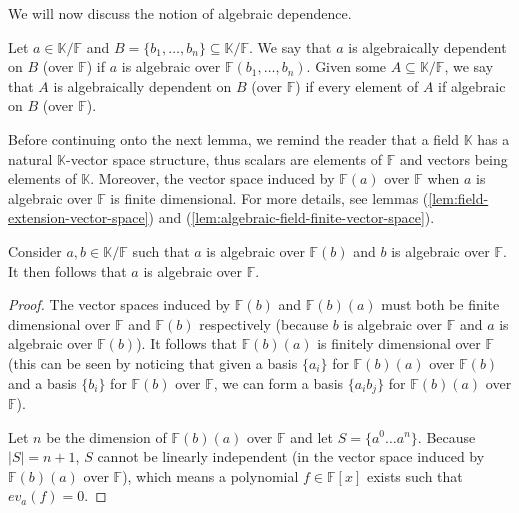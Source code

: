 We will now discuss the notion of algebraic dependence.

\begin{defn}
	Let $a \in \mathbb K / \mathbb F$ and $B = \{b _1, \ldots, b _n \} \subseteq  \mathbb K / \mathbb F$. We say that $a$ is algebraically dependent on $B$ (over $ \mathbb{F} $) if $a$ is algebraic over $\mathbb F(b _1, \ldots, b _n )$. Given some $A \subseteq  \mathbb K / \mathbb{F} $, we say that $A$ is algebraically dependent on $B$ (over $\mathbb{F} $) if every element of $A$ if algebraic on $B$ (over $\mathbb{F} $).
\end{defn}

Before continuing onto the next lemma, we remind the reader that a field $\mathbb{K}$ has a natural $\mathbb{K}$-vector space structure, thus scalars are elements of $\mathbb{F} $ and vectors being elements of $\mathbb K$. Moreover, the vector space induced by $\mathbb{F} (a)$ over $\mathbb{F} $ when $a$ is algebraic over $\mathbb{F} $ is finite dimensional. For more details, see lemmas (\ref{lem:field-extension-vector-space}) and (\ref{lem:algebraic-field-finite-vector-space}).

\begin{lemma}\label{lem:algebraic-transitivity}
	Consider $a, b \in \mathbb K / \mathbb{F} $ such that $a$ is algebraic over $\mathbb{F}(b) $ and $b$ is algebraic over $\mathbb{F}$. It then follows that $a$ is algebraic over $\mathbb{F}$.
\end{lemma}

\begin{proof}
	The vector spaces induced by $\mathbb{F} (b)$ and $\mathbb{F} (b)(a)$ must both be finite dimensional over $\mathbb{F} $ and $\mathbb{F} (b)$ respectively (because $b$ is algebraic over $\mathbb{F} $ and $a$ is algebraic over $\mathbb{F} (b)$). It follows that $\mathbb{F} (b)(a)$ is finitely dimensional over $\mathbb{F}$ (this can be seen by noticing that given a basis $\{a _i \}$ for $\mathbb{F} (b)(a)$ over $\mathbb{F} (b)$ and a basis $\{b _i\}$ for $\mathbb{F} (b)$ over $\mathbb{F} $, we can form a basis $\{a _i b _j\}$ for $\mathbb{F} (b)(a)$ over $\mathbb{F} $).

	Let $n$ be the dimension of $\mathbb{F} (b)(a)$ over $\mathbb{F} $ and let $S = \{a ^0 \ldots a ^n \}$. Because $|S| = n + 1$, $S$ cannot be linearly independent (in the vector space induced by $\mathbb{F} (b)(a)$ over $\mathbb{F} $), which means a polynomial $f \in \mathbb{F} [x]$ exists such that $ev_a(f) = 0$.
\end{proof}

